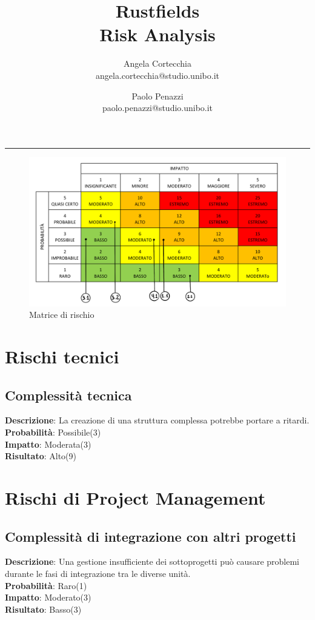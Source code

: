 \documentclass[12pt, a4paper]{article}
\title{\LARGE
    Rustfields \\ 
    \small
    Risk Analysis
    }
\author{
    Angela Cortecchia \\ 
    \small 
    angela.cortecchia@studio.unibo.it
    \and
    Paolo Penazzi \\ 
    \small
    paolo.penazzi@studio.unibo.it
}
\date{\small }
\begin{document}
\maketitle
\par\noindent\rule{\textwidth}{0.5pt}

\begin{figure}[ht]
    \centering %
    \includegraphics[width=1\linewidth]{images/risk_matrix.png}
    \caption{Matrice di rischio}
    \label{fig:matrix}
\end{figure}

\section{Rischi tecnici}
\subsection{Complessità tecnica}
\textbf{Descrizione}: La creazione di una struttura complessa potrebbe portare a ritardi.\\
\textbf{Probabilità}: Possibile(3)\\
\textbf{Impatto}:  Moderata(3)\\
\textbf{Risultato}: Alto(9)\\

\section{Rischi di Project Management}
\subsection{Complessità di integrazione con altri progetti}
\textbf{Descrizione}: Una gestione insufficiente dei sottoprogetti può causare problemi durante le fasi di integrazione tra le diverse unità.\\
\textbf{Probabilità}: Raro(1)\\
\textbf{Impatto}: Moderato(3)\\
\textbf{Risultato}: Basso(3)\\
\end{document}
